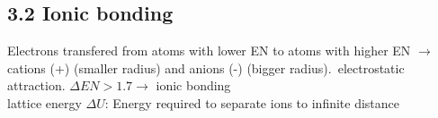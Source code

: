 \subsection{3.2 Ionic bonding}
    Electrons transfered from atoms with lower EN to atoms with higher EN $\rightarrow$ cations (+) (smaller radius) and anions (-) (bigger radius).\ electrostatic attraction. $\Delta EN > 1.7 \rightarrow$ ionic bonding\\
    lattice energy $\Delta U$: Energy required to separate ions to infinite distance
